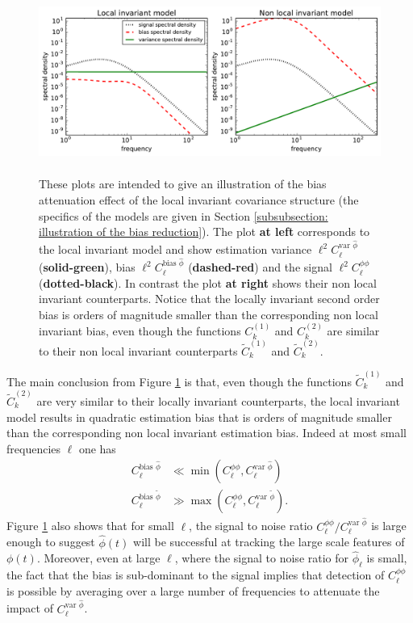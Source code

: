 \documentclass[10pt,noinfoline]{imsart}
\begin{document}
\begin{figure}[H]
\includegraphics[height=6cm]{figure1.pdf}
\caption{
 These plots are intended to give an illustration  of the bias attenuation effect of the local invariant covariance structure (the specifics of the models are given in Section \ref{subsubsection: illustration of the bias reduction}).  The plot \textbf{at left} corresponds to the local invariant model and show estimation variance $\ell^2 C_{\ell}^{\text{var }\hat \phi}$ (\textbf{solid-green}), bias $\ell^2 C_{\ell}^{\text{bias }\hat \phi}$ (\textbf{dashed-red}) and the signal $\ell^2 C_{\ell}^{\phi\phi}$ (\textbf{dotted-black}). In contrast the plot \textbf{at right} shows their non local invariant counterparts.  Notice that the locally invariant second order bias is orders of magnitude smaller than the corresponding non local invariant bias, even though the functions $ C^{(1)}_k$ and $ C^{(2)}_k$ are similar to their non local invariant counterparts  $\widetilde C^{(1)}_k$ and $\widetilde C^{(2)}_k$. }
\label{Figure 1}
\end{figure}

The main conclusion from Figure \ref{Figure 1} is that, even though the functions $\widetilde C^{(1)}_k$ and $\widetilde C^{(2)}_k$ are very similar to their locally invariant counterparts, the local invariant model results in quadratic estimation bias that is orders of magnitude smaller than the corresponding non local invariant estimation bias. Indeed at most small frequencies $\ell$ one has
\begin{align*}
 C_{\ell}^{\text{bias }\hat \phi} &\ll \min(C_{\ell}^{\phi\phi}, C_{\ell}^{\text{var }\hat \phi}) \\
 C_{\ell}^{\text{bias }\widetilde \phi} &\gg \max( C_{\ell}^{\phi\phi}, C_{\ell}^{\text{var }\widetilde \phi}).
\end{align*}
Figure \ref{Figure 1} also shows that for small $\ell$, the signal to noise ratio $C_{\ell}^{\phi\phi}/C_{\ell}^{\text{var }\hat \phi}$ is large enough to suggest $\hat\phi(t)$ will be successful at tracking the large scale features of $\phi(t)$. Moreover, even at large $\ell$, where the signal to noise ratio for $\hat\phi_{\ell}$ is small, the fact that the bias is sub-dominant to the signal implies that detection of $C_{\ell}^{\phi\phi}$ is possible by averaging over a large number of frequencies to attenuate the impact of $C_{\ell}^{\text{var }\hat \phi}$.
\end{document}
